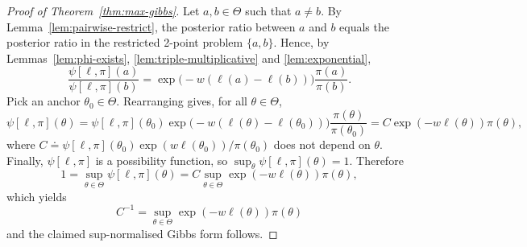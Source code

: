\documentclass[accepted]{uai2026} %
\theoremstyle{remark}
\begin{document}
\begin{proof}[Proof of Theorem~\ref{thm:max-gibbs}]
Let $a,b\in\Theta$ such that $a \neq b$. By Lemma~\ref{lem:pairwise-restrict}, the posterior ratio between $a$ and $b$ equals the posterior ratio in the restricted 2-point problem $\{a,b\}$. Hence, by Lemmas~\ref{lem:phi-exists},
\ref{lem:triple-multiplicative} and \ref{lem:exponential},
\[
\frac{\psi[\ell,\pi](a)}{\psi[\ell,\pi](b)}
= \exp\big(-w(\ell(a)-\ell(b))\big) \frac{\pi(a)}{\pi(b)}.
\]
Pick an anchor $\theta_0\in\Theta$. Rearranging gives, for all $\theta\in\Theta$,
\[
\psi[\ell,\pi](\theta) = \psi[\ell,\pi](\theta_0) \exp\big(-w(\ell(\theta)-\ell(\theta_0))\big)
\frac{\pi(\theta)}{\pi(\theta_0)}
= C \exp(-w \ell(\theta)) \pi(\theta),
\]
where $C \doteq \psi[\ell,\pi](\theta_0)\exp(w\ell(\theta_0)) / \pi(\theta_0)$ does not depend on $\theta$. Finally, $\psi[\ell,\pi]$ is a possibility function, so $\sup_{\theta} \psi[\ell,\pi](\theta) = 1$. Therefore
\[
1 = \sup_{\theta\in\Theta} \psi[\ell,\pi](\theta)
= C \sup_{\theta\in\Theta} \exp(-w \ell(\theta)) \pi(\theta),
\]
which yields
\[
C^{-1} = \sup_{\theta\in\Theta}\exp(-w \ell(\theta)) \pi(\theta)
\]
and the claimed sup-normalised Gibbs form follows.
\end{proof}
\end{document}
